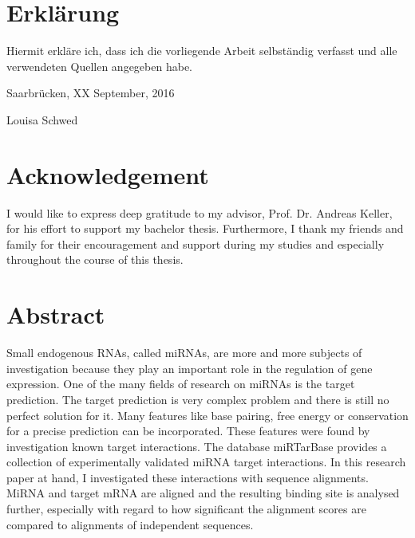 \documentclass[12pt]{article}
\begin{document}
\section*{Erkl\"{a}rung}
Hiermit erkl\"{a}re ich, dass ich die vorliegende Arbeit selbst\"{a}ndig verfasst und alle 
verwendeten Quellen angegeben habe.

\vspace{1cm}

\noindent Saarbr\"ucken, XX September, 2016
\vspace{1.5cm}

\noindent Louisa Schwed
\newpage
\mbox{}

\section*{Acknowledgement}
I would like to express deep gratitude to my advisor, Prof. Dr. Andreas Keller, for his effort to support my bachelor thesis. Furthermore, I thank my friends and family for their encouragement and support during my studies and especially throughout the course of this thesis. 

\newpage


\tableofcontents

\newpage 
\pagestyle{plain}



\section*{Abstract}

Small endogenous RNAs, called miRNAs, are more and more subjects of investigation because they play an important role in the regulation of gene expression. One of the many fields of research on miRNAs is the target prediction. The target prediction is very complex problem and there is still no perfect solution for it. Many features like base pairing, free energy or conservation for a precise prediction can be incorporated. These features were found by investigation known target interactions. The database miRTarBase provides a collection of experimentally validated miRNA target interactions. In this research paper at hand, I investigated these interactions with sequence alignments. MiRNA and target mRNA are aligned and the resulting binding site is analysed further, especially with regard to how significant the alignment scores are compared to alignments of independent sequences.
 
\end{document}
